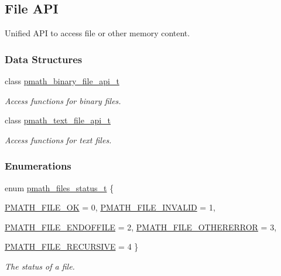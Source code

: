 \hypertarget{group__file__api}{
\subsection{File API}
\label{group__file__api}
}
Unified API to access file or other memory content.  


\subsubsection*{Data Structures}
\begin{CompactItemize}
\item 
class \hyperlink{structpmath__binary__file__api__t}{pmath\_\-binary\_\-file\_\-api\_\-t}
\begin{CompactList}\small\item\em Access functions for binary files. \item\end{CompactList}\item 
class \hyperlink{structpmath__text__file__api__t}{pmath\_\-text\_\-file\_\-api\_\-t}
\begin{CompactList}\small\item\em Access functions for text files. \item\end{CompactList}\end{CompactItemize}
\subsubsection*{Enumerations}
\begin{CompactItemize}
\item 
enum \hyperlink{group__file__api_g1fa07caf59a04495b7c74be6aff3a3d9}{pmath\_\-files\_\-status\_\-t} \{ \par
\hyperlink{group__file__api_gg1fa07caf59a04495b7c74be6aff3a3d9bacfd61bc852b4be54280715375f36c0}{PMATH\_\-FILE\_\-OK} =  0, 
\hyperlink{group__file__api_gg1fa07caf59a04495b7c74be6aff3a3d93c23923ffa72af933ad29272b9baedc6}{PMATH\_\-FILE\_\-INVALID} =  1, 
\par
\hyperlink{group__file__api_gg1fa07caf59a04495b7c74be6aff3a3d964498ce552430289369bbfc0c05e7721}{PMATH\_\-FILE\_\-ENDOFFILE} =  2, 
\hyperlink{group__file__api_gg1fa07caf59a04495b7c74be6aff3a3d91b71851e549f8ecdd0f1e338d24fff43}{PMATH\_\-FILE\_\-OTHERERROR} =  3, 
\par
\hyperlink{group__file__api_gg1fa07caf59a04495b7c74be6aff3a3d93df4d4f5a846c3a5e3ecdda899945e0c}{PMATH\_\-FILE\_\-RECURSIVE} =  4
 \}
\begin{CompactList}\small\item\em The status of a file. \item\end{CompactList}\end{CompactItemize}
